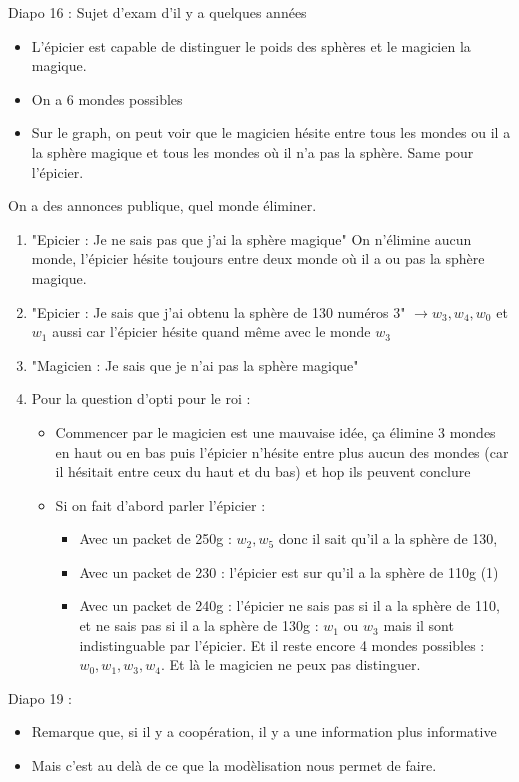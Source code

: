 \documentclass{article}
\theoremstyle{plain}%
\theoremstyle{definition}
\theoremstyle{remark}
\begin{document}
Diapo 16 : Sujet d'exam d'il y a quelques années
\begin{itemize}
    \item L'épicier est capable de distinguer le poids des sphères et le magicien la magique.
    \item On a 6 mondes possibles
    \item Sur le graph, on peut voir que le magicien hésite entre tous les mondes ou il a la sphère magique et tous les mondes où il n'a pas la sphère. Same pour l'épicier.
\end{itemize}
On a des annonces publique, quel monde éliminer.
\begin{enumerate}
    \item "Epicier : Je ne sais pas que j'ai la sphère magique" On n'élimine aucun monde, l'épicier hésite toujours entre deux monde où il a ou pas la sphère magique.
    \item "Epicier : Je sais que j'ai obtenu la sphère de 130 numéros 3" $\rightarrow w_3, w_4, w_0$ et $ w_1 $ aussi car l'épicier hésite quand même avec le monde $ w_3 $ 
    \item "Magicien : Je sais que je n'ai pas la sphère magique" 
    \item Pour la question d'opti pour le roi : \begin{itemize}
        \item Commencer par le magicien est une mauvaise idée, ça élimine 3 mondes en haut ou en bas puis l'épicier n'hésite entre plus aucun des mondes (car il hésitait entre ceux du haut et du bas) et hop ils peuvent conclure
        \item Si on fait d'abord parler l'épicier : \begin{itemize}
            \item Avec un packet de 250g : $ w_2, w_5 $ donc il sait qu'il a la sphère de 130, 
            \item Avec un packet de 230 : l'épicier est sur qu'il a la sphère de 110g (1)
            \item Avec un packet de 240g : l'épicier ne sais pas si il a la sphère de 110, et ne sais pas si il a la sphère de 130g : $ w_1 $ ou $ w_3 $ mais il sont indistinguable par l'épicier. Et il reste encore 4 mondes possibles : $ w_0, w_1, w_3, w_4 $. Et là le magicien ne peux pas distinguer. 
        \end{itemize}
    \end{itemize}
\end{enumerate}
Diapo 19 : 
\begin{itemize}
    \item Remarque que, si il y a coopération, il y a une information plus informative
    \item Mais c'est au delà de ce que la modèlisation nous permet de faire.
\end{itemize}
\end{document}
